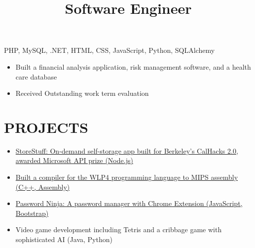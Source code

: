 \documentclass[]{res}
\begin{document}
\begin{resume}
  \title{Software Engineer}
  \begin{position}
    \begin{description}
      \item PHP, MySQL, .NET, HTML, CSS, JavaScript, Python, SQLAlchemy
    \end{description}
    \begin{itemize}
      \item Built a financial analysis application, risk management software, and a health care database
      \item Received Outstanding work term evaluation
    \end{itemize}
  \end{position}

\section{PROJECTS}
  \begin{itemize}
    \item \href{https://github.com/paulashbourne/storestuff}
      {StoreStuff: On-demand self-storage app built for Berkeley's CalHacks 2.0, awarded Microsoft API prize (Node.js)}
    \item \href{https://github.com/paulashbourne/wlp4compiler}
      {Built a compiler for the WLP4 programming language to MIPS assembly (C++, Assembly)}
    \item \href{http://password-ninja.com/}
      {Password Ninja: A password manager with Chrome Extension (JavaScript, Bootstrap)}
    \item Video game development including Tetris and a cribbage game with sophisticated AI (Java, Python)
  \end{itemize}


\end{resume}
\end{document}
